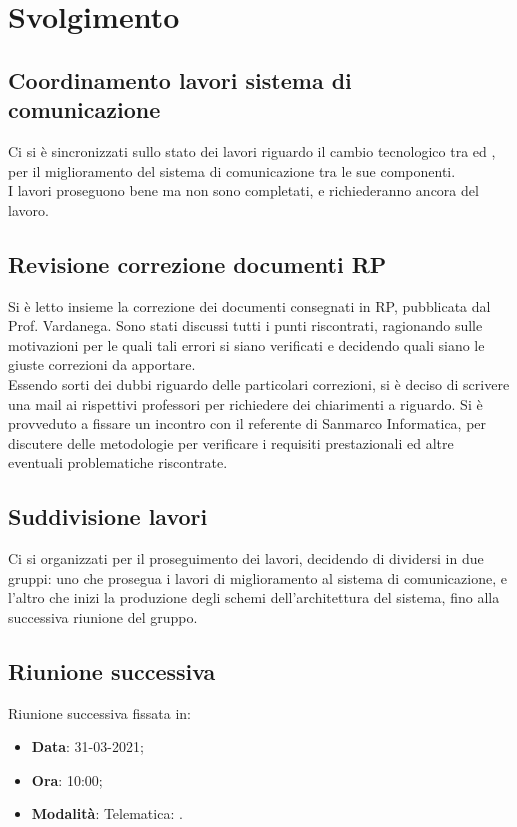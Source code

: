 \documentclass[]{article}
\begin{document}
	\newpage

	\section{Svolgimento}
		\subsection{Coordinamento lavori sistema di comunicazione}
		Ci si è sincronizzati sullo stato dei lavori riguardo il cambio tecnologico tra  ed , per il miglioramento del sistema di comunicazione tra le sue componenti. \\
		I lavori proseguono bene ma non sono completati, e richiederanno ancora del lavoro.
		\\
		
		\subsection{Revisione correzione documenti RP}
		Si è letto insieme la correzione dei documenti consegnati in RP, pubblicata dal Prof. Vardanega. Sono stati discussi tutti i punti riscontrati, ragionando sulle motivazioni per le quali tali errori si siano verificati e decidendo quali siano le giuste correzioni da apportare. \\
		Essendo sorti dei dubbi riguardo delle particolari correzioni, si è deciso di scrivere una mail ai rispettivi professori per richiedere dei chiarimenti a riguardo.
		Si è provveduto a fissare un incontro con il referente di Sanmarco Informatica, per discutere delle metodologie per verificare i requisiti prestazionali ed altre eventuali problematiche riscontrate.
		\\
		
		\subsection{Suddivisione lavori}
		Ci si organizzati per il proseguimento dei lavori, decidendo di dividersi in due gruppi: uno che prosegua i lavori di miglioramento al sistema di comunicazione, e l'altro che inizi la produzione degli schemi dell'architettura del sistema, fino alla successiva riunione del gruppo.
		\\


	\subsection{Riunione successiva}
	Riunione successiva fissata in:
	\begin{itemize}
		\item \textbf{Data}: 31-03-2021;
		\item \textbf{Ora}: 10:00;
		\item \textbf{Modalità}: Telematica: .
	\end{itemize}
\end{document}

